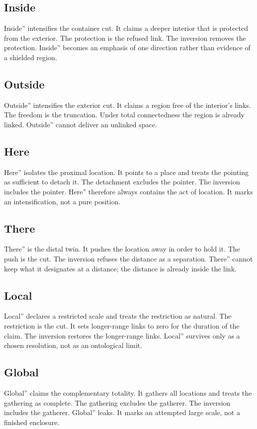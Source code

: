 \documentclass[11pt,a4paper]{article}
\begin{document}
\subsection{Inside} Inside'' intensifies the container cut. It claims a deeper interior that is protected from the exterior. The protection is the refused link. The inversion removes the protection. Inside'' becomes an emphasis of one direction rather than evidence of a shielded region.

\subsection{Outside} Outside'' intensifies the exterior cut. It claims a region free of the interior’s links. The freedom is the truncation. Under total connectedness the region is already linked. Outside'' cannot deliver an unlinked space.

\subsection{Here} Here'' isolates the proximal location. It points to a place and treats the pointing as sufficient to detach it. The detachment excludes the pointer. The inversion includes the pointer. Here'' therefore always contains the act of location. It marks an intensification, not a pure position.

\subsection{There} There'' is the distal twin. It pushes the location away in order to hold it. The push is the cut. The inversion refuses the distance as a separation. There'' cannot keep what it designates at a distance; the distance is already inside the link.

\subsection{Local} Local'' declares a restricted scale and treats the restriction as natural. The restriction is the cut. It sets longer-range links to zero for the duration of the claim. The inversion restores the longer-range links. Local'' survives only as a chosen resolution, not as an ontological limit.

\subsection{Global} Global'' claims the complementary totality. It gathers all locations and treats the gathering as complete. The gathering excludes the gatherer. The inversion includes the gatherer. Global'' leaks. It marks an attempted large scale, not a finished enclosure.
\end{document}
